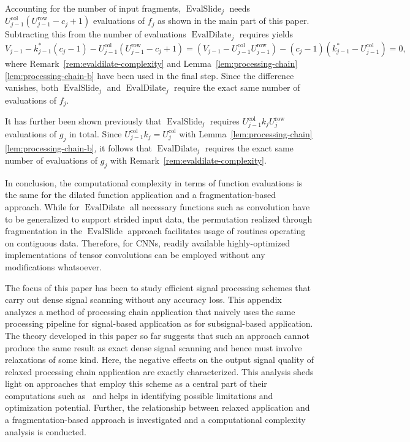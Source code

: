 \documentclass[journal]{IEEEtran}
\DeclareMathOperator{\EvalSlide}{EvalSlide}
\newcommand{\row}{\operatorname{row}}
\newcommand{\col}{\operatorname{col}}
\DeclareMathOperator{\EvalDilate}{EvalDilate}
\begin{document}
Accounting for the number of input fragments, $\EvalSlide_j$ needs $U_{j - 1}^{\col} (U_{j - 1}^{\row} - c_j + 1)$ evaluations of $f_j$ as shown in the main part of this paper.
Subtracting this from the number of evaluations $\EvalDilate_j$ requires yields
\begin{displaymath}
  V_{j - 1} - k_{j - 1}^*(c_j - 1) - U_{j - 1}^{\col} (U_{j - 1}^{\row} - c_j + 1)
  = \left(V_{j - 1} - U_{j - 1}^{\col}U_{j - 1}^{\row}\right) - (c_j - 1)\left(k_{j - 1}^* - U_{j - 1}^{\col}\right)
  = 0\text{,}
\end{displaymath}
where Remark~\ref{rem:evaldilate-complexity} and Lemma~\ref{lem:processing-chain}\ref{lem:processing-chain-b} have been used in the final step.
Since the difference vanishes, both $\EvalSlide_j$ and $\EvalDilate_j$ require the exact same number of evaluations of $f_j$.

It has further been shown previously that $\EvalSlide_j$ requires $U_{j - 1}^{\col}k_j U_j^{\row}$ evaluations of $g_j$ in total.
Since $U_{j - 1}^{\col}k_j = U_j^{\col}$ with Lemma~\ref{lem:processing-chain}\ref{lem:processing-chain-b}, it follows that $\EvalDilate_j$ requires the exact same number of evaluations of $g_j$ with Remark~\ref{rem:evaldilate-complexity}.

In conclusion, the computational complexity in terms of function evaluations is the same for the dilated function application and a fragmentation-based approach.
While for $\EvalDilate$ all necessary functions such as convolution have to be generalized to support strided input data, the permutation realized through fragmentation in the $\EvalSlide$ approach facilitates usage of routines operating on contiguous data.
Therefore, for CNNs, readily available highly-optimized implementations of tensor convolutions can be employed without any modifications whatsoever.

\clearpage
{}
The focus of this paper has been to study efficient signal processing schemes that carry out dense signal scanning without any accuracy loss.
This appendix analyzes a method of processing chain application that naively uses the same processing pipeline for signal-based application as for subsignal-based application.
The theory developed in this paper so far suggests that such an approach cannot produce the same result as exact dense signal scanning and hence must involve relaxations of some kind.
Here, the negative effects on the output signal quality of relaxed processing chain application are exactly characterized.
This analysis sheds light on approaches that employ this scheme as a central part of their computations such as~ and helps in identifying possible limitations and optimization potential.
Further, the relationship between relaxed application and a fragmentation-based approach is investigated and a computational complexity analysis is conducted.
\end{document}
